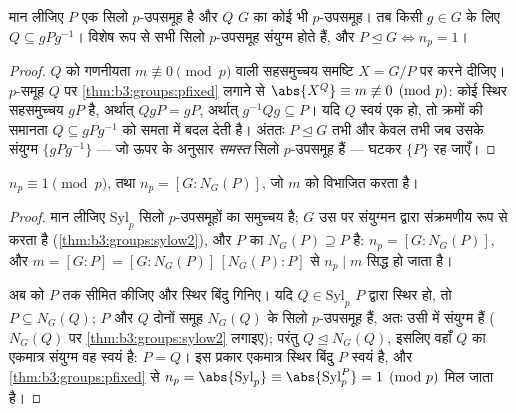 \begin{theorem}[सिलो II: प्रभुत्व और संयुग्मता]\label{thm:b3:groups:sylow2}
मान लीजिए $P$ एक सिलो $p$-उपसमूह है और $Q$ $G$ का कोई
भी $p$-उपसमूह। तब किसी $g \in G$ के लिए $Q \subseteq gPg^{-1}$। विशेष रूप से सभी
सिलो $p$-उपसमूह संयुग्म होते हैं, और $P \trianglelefteq G \iff
n_p = 1$।
\end{theorem}

\begin{proof}
$Q$ को गणनीयता $m
\not\equiv 0 \pmod p$ वाली सहसमुच्चय समष्टि $X = G/P$ पर 
करने दीजिए। $p$-समूह $Q$ पर \cref{thm:b3:groups:pfixed} लगाने से $\abs{X^Q} \equiv m \not\equiv 0 \pmod p$: कोई स्थिर
सहसमुच्चय $gP$ है, अर्थात् $QgP = gP$, अर्थात् $g^{-1}Qg \subseteq
P$। यदि $Q$
स्वयं एक  हो, तो क्रमों की समानता $Q \subseteq gPg^{-1}$ को समता में
बदल देती है। अंततः $P
\trianglelefteq G$ तभी और केवल तभी जब उसके संयुग्म $\{gPg^{-1}\}$
--- जो ऊपर के अनुसार \emph{समस्त} सिलो $p$-उपसमूह हैं --- घटकर
$\{P\}$ रह जाएँ।
\end{proof}

\begin{theorem}\label{thm:b3:groups:sylow3}
$n_p \equiv 1 \pmod p$, तथा $n_p = [G : N_G(P)]$, जो $m$ को विभाजित करता है।
\end{theorem}

\begin{proof}
मान लीजिए $\mathrm{Syl}_p$ सिलो $p$-उपसमूहों का समुच्चय है; $G$ उस पर
संयुग्मन द्वारा संक्रमणीय रूप से  करता है (\cref{thm:b3:groups:sylow2}), और
$P$ का   $N_G(P) \supseteq P$ है: $n_p = [G :
N_G(P)]$, और $m = [G:P] = [G:N_G(P)]\,[N_G(P):P]$ से
$n_p \mid
m$ सिद्ध हो जाता है।

अब  को $P$ तक सीमित कीजिए और स्थिर बिंदु गिनिए। यदि
$Q \in
\mathrm{Syl}_p$ $P$ द्वारा स्थिर हो, तो $P \subseteq N_G(Q)$; $P$ और $Q$ दोनों
समूह $N_G(Q)$ के सिलो $p$-उपसमूह हैं, अतः उसी में संयुग्म हैं
($N_G(Q)$ पर \cref{thm:b3:groups:sylow2} लगाइए); परंतु $Q \trianglelefteq N_G(Q)$, इसलिए वहाँ $Q$ का एकमात्र
संयुग्म वह स्वयं है: $P = Q$। इस प्रकार एकमात्र स्थिर बिंदु $P$
स्वयं है, और \cref{thm:b3:groups:pfixed} से $n_p = \abs{\mathrm{Syl}_p}
\equiv \abs{\mathrm{Syl}_p^P} = 1 \pmod p$ मिल जाता है।
\end{proof}

